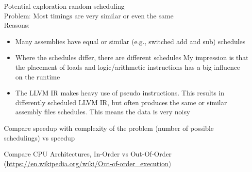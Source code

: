 Potential exploration \rightarrow random scheduling \\
Problem: Most timings are very similar or even the same \\
Reasons:
\begin{itemize}
    \item Many assemblies have equal or similar (e.g., switched add and sub) schedules
    \item Where the schedules differ, there are different schedules
    My impression is that the placement of loads and logic/arithmetic instructions has a big influence on the runtime
    \item The LLVM IR makes heavy use of pseudo instructions.
    This results in differently scheduled LLVM IR, but often produces the same or similar assembly files schedules.
    This means the data is very noisy
\end{itemize}

Compare speedup with complexity of the problem (number of possible schedulings) vs speedup

Compare CPU Architectures, In-Order vs Out-Of-Order (\url{https://en.wikipedia.org/wiki/Out-of-order_execution})

